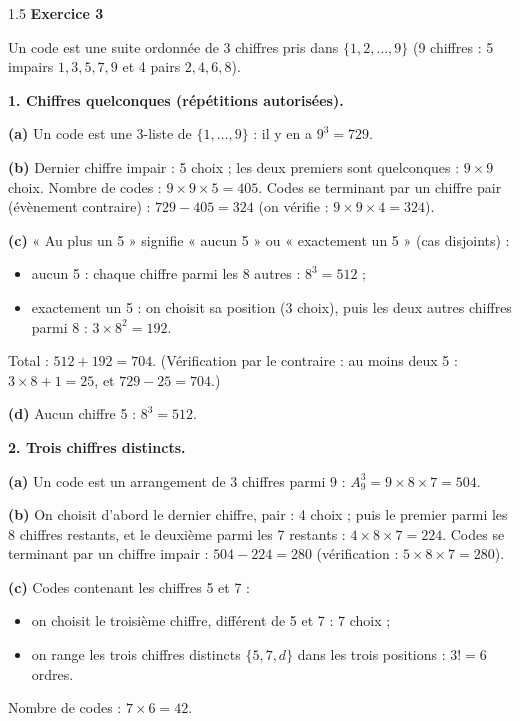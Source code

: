 \documentclass[12pt]{article}
\begin{document}
\begin{spacing}{1.5}
\medskip\textbf{Exercice 3}

Un code est une suite ordonnée de 3 chiffres pris dans $\{1,2,\dots,9\}$ (9 chiffres : 5 impairs $1,3,5,7,9$ et 4 pairs $2,4,6,8$).

\textbf{1. Chiffres quelconques (répétitions autorisées).}

\textbf{(a)} Un code est une 3-liste de $\{1,\dots,9\}$ : il y en a $9^3=\boxed{729}$.

\textbf{(b)} Dernier chiffre impair : 5 choix ; les deux premiers sont quelconques : $9\times9$ choix. Nombre de codes : $9\times9\times5=\boxed{405}$.
Codes se terminant par un chiffre pair (évènement contraire) : $729-405=\boxed{324}$ (on vérifie : $9\times9\times4=324$).

\textbf{(c)} « Au plus un 5 » signifie « aucun 5 » ou « exactement un 5 » (cas disjoints) :
\begin{itemize}
\item aucun 5 : chaque chiffre parmi les 8 autres : $8^3=512$ ;
\item exactement un 5 : on choisit sa position ($3$ choix), puis les deux autres chiffres parmi 8 : $3\times8^2=192$.
\end{itemize}
Total : $512+192=\boxed{704}$.
(Vérification par le contraire : au moins deux 5 : $3\times8+1=25$, et $729-25=704$.)

\textbf{(d)} Aucun chiffre 5 : $8^3=\boxed{512}$.

\textbf{2. Trois chiffres distincts.}

\textbf{(a)} Un code est un arrangement de 3 chiffres parmi 9 : $A_9^3=9\times8\times7=\boxed{504}$.

\textbf{(b)} On choisit d'abord le dernier chiffre, pair : 4 choix ; puis le premier parmi les 8 chiffres restants, et le deuxième parmi les 7 restants : $4\times8\times7=\boxed{224}$.
Codes se terminant par un chiffre impair : $504-224=\boxed{280}$ (vérification : $5\times8\times7=280$).

\textbf{(c)} Codes contenant les chiffres 5 et 7 :
\begin{itemize}
\item on choisit le troisième chiffre, différent de 5 et 7 : $7$ choix ;
\item on range les trois chiffres distincts $\{5,7,d\}$ dans les trois positions : $3!=6$ ordres.
\end{itemize}
Nombre de codes : $7\times6=\boxed{42}$.



\end{spacing}
\end{document}
